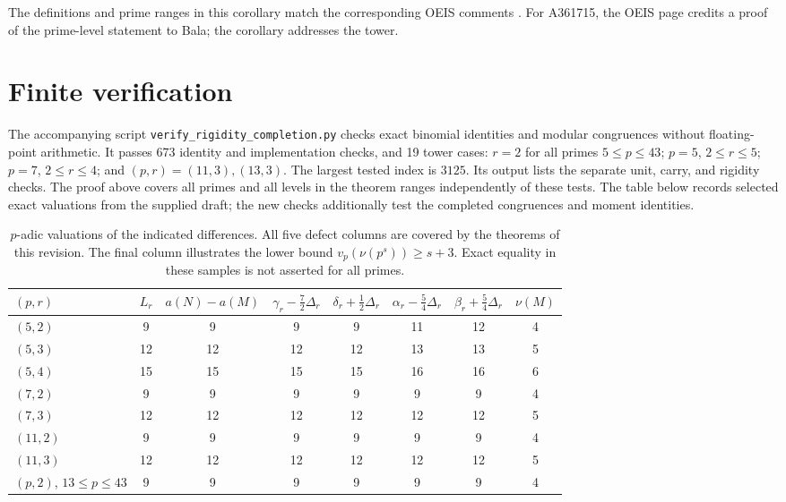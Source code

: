 \documentclass[11pt]{amsart}
\theoremstyle{definition}
\theoremstyle{remark}
\begin{document}
The definitions and prime ranges in this corollary match the corresponding
OEIS comments \cite{OEIS}. For A361715, the OEIS page credits a proof
of the prime-level statement to Bala; the corollary addresses the tower.

\section{Finite verification}
The accompanying script \texttt{verify\_rigidity\_completion.py} checks exact
binomial identities and modular congruences without floating-point arithmetic.
It passes 673 identity and implementation checks, and 19 tower cases:
$r=2$ for all primes $5\le p\le43$; $p=5$, $2\le r\le5$;
$p=7$, $2\le r\le4$; and $(p,r)=(11,3),(13,3)$.
The largest tested index is $3125$. Its output lists the separate unit, carry,
and rigidity checks. The proof above covers
all primes and all levels in the theorem ranges independently of these tests.
The table below records selected exact valuations from the supplied draft;
the new checks additionally test the completed congruences and moment identities.
\begin{table}[ht]
\centering
\small
\begin{tabular}{@{}lccccccc@{}}
\toprule
$(p,r)$ & $L_r$ & $a(N)-a(M)$ & $\gamma_r-\tfrac72\Delta_r$ & $\delta_r+\tfrac12\Delta_r$ & $\alpha_r-\tfrac54\Delta_r$ & $\beta_r+\tfrac54\Delta_r$ & $\nu(M)$\\
\midrule
$(5,2)$ & 9 & 9 & 9 & 9 & 11 & 12 & 4\\
$(5,3)$ & 12 & 12 & 12 & 12 & 13 & 13 & 5\\
$(5,4)$ & 15 & 15 & 15 & 15 & 16 & 16 & 6\\
$(7,2)$ & 9 & 9 & 9 & 9 & 9 & 9 & 4\\
$(7,3)$ & 12 & 12 & 12 & 12 & 12 & 12 & 5\\
$(11,2)$ & 9 & 9 & 9 & 9 & 9 & 9 & 4\\
$(11,3)$ & 12 & 12 & 12 & 12 & 12 & 12 & 5\\
$(p,2)$, $13\le p\le43$ & 9 & 9 & 9 & 9 & 9 & 9 & 4\\
\bottomrule
\end{tabular}
\caption{$p$-adic valuations of the indicated differences. All five defect columns are covered by the theorems of this revision.
The final column illustrates the lower bound $v_p(\nu(p^s))\ge s+3$.
Exact equality in these samples is not asserted for all primes.}
\label{tab:num}
\end{table}
\end{document}
